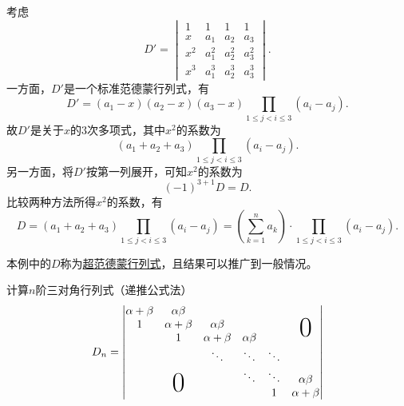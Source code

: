 \begin{solution}
考虑
$$D' = \begin{vmatrix}
1 & 1 & 1 & 1 \\ x &  a_1 & a_2 & a_3 \\ x^2 & a_1^2 & a_2^2 & a_3^2 \\ x^3 & a_1^3 & a_2^3 & a_3^3
\end{vmatrix}.$$
一方面，$D'$是一个标准范德蒙行列式，有
$$D' = (a_1-x)(a_2-x)(a_3-x)\prod_{1\leqslant j < i \leqslant 3} (a_i - a_j).$$
故$D'$是关于$x$的$3$次多项式，其中$x^2$的系数为
$$(a_1+a_2+a_3)\prod_{1\leqslant j < i \leqslant 3} (a_i - a_j).$$
另一方面，将$D'$按第一列展开，可知$x^2$的系数为
$$(-1)^{3+1}D = D.$$
比较两种方法所得$x^2$的系数，有
$$D = (a_1+a_2+a_3)\prod_{1\leqslant j < i \leqslant 3} (a_i - a_j) = \left(\sum\limits_{k=1}^n a_k\right)\cdot\prod_{1\leqslant j < i \leqslant 3} (a_i - a_j).$$

本例中的$D$称为\underline{超范德蒙行列式}，且结果可以推广到一般情况。
\end{solution}

\begin{eg}
计算$n$阶三对角行列式（递推公式法）
$$D_n = \begin{vmatrix}
\alpha + \beta & \alpha\beta & & & & \\ 1 & \alpha + \beta & \alpha\beta & & & \makebox(0,0){\text{\Huge0}} \\ & 1 & \alpha + \beta & \alpha\beta & & \\ & & \ddots & \ddots & \ddots & \\ & \makebox(0,0){\text{\Huge0}} & & \ddots & \ddots & \alpha\beta \\ & & & & 1 & \alpha + \beta
\end{vmatrix}$$
\end{eg}

